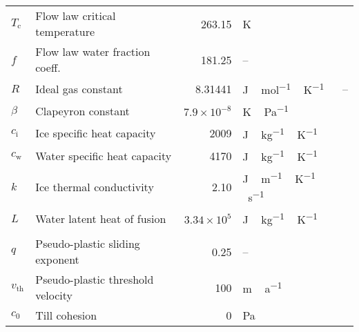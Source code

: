 \documentclass[tc, manuscript]{copernicus}
\begin{document}
\begin{table*}
{\begin{tabular}{llrll}
        $T_{\mathrm{c}}$   & Flow law critical temperature
                & 263.15
                & \unit{K}
                & \citet{Paterson.Budd.1982} \\

        $f$     & Flow law water fraction coeff.
                & 181.25
                & --
                & \citet{Lliboutry.Duval.1985} \\

        $R$     & Ideal gas constant
                & 8.31441
                & \unit{J\,mol^{-1}\,K^{-1}}
                & -- \\

        $\beta$ & Clapeyron constant
                & $7.9 \times 10^{-8}$
                & \unit{K\,Pa^{-1}}
                & \citet{Luthi.etal.2002} \\

        $c_{\mathrm{i}}$   & Ice specific heat capacity
                & 2009
                & \unit{J\,kg^{-1}\,K^{-1}}
                & \citet{Aschwanden.etal.2012} \\

        $c_{\mathrm{w}}$   & Water specific heat capacity
                & 4170
                & \unit{J\,kg^{-1}\,K^{-1}}
                & \citet{Aschwanden.etal.2012} \\

        $k$     & Ice thermal conductivity
                & 2.10
                & \unit{J\,m^{-1}\,K^{-1}\,s^{-1}}
                & \citet{Aschwanden.etal.2012} \\

        $L$     & Water latent heat of fusion
                & $3.34\times10^5$
                & \unit{J\,kg^{-1}\,K^{-1}}
                & \citet{Aschwanden.etal.2012} \\

        \middlehline
        \multicolumn{2}{l}{{Basal sliding}} \\
        \middlehline

        $q$     & Pseudo-plastic sliding exponent
                & 0.25
                & --
                & \citet{Aschwanden.etal.2013} \\

        $v_{\text{th}}$& Pseudo-plastic threshold velocity
                & 100
                & \unit{m\,a^{-1}}
                & \citet{Aschwanden.etal.2013} \\

        $c_0$   & Till cohesion
                & 0
                & Pa
                & \citet{Tulaczyk.etal.2000} \\


\end{tabular}}
\end{table*}
\end{document}

